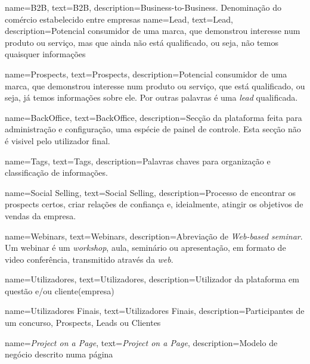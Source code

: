 {
        name=B2B,
        text=B2B,
        description={Business-to-Business. Denominação do comércio estabelecido entre empresas}
}
{
	name=Lead,
	text=Lead,
	description={Potencial consumidor de uma marca, que demonstrou interesse num produto ou serviço, mas que ainda não está qualificado, ou seja, não temos quaisquer informações}
}

{
	name=Prospects,
	text=Prospects,
	description={Potencial consumidor de uma marca, que demonstrou interesse num produto ou serviço, que está qualificado, ou seja, já temos informações sobre ele. Por outras palavras é uma \textit{lead} qualificada.}
}

{
	name=BackOffice,
	text=BackOffice,
	description={Secção da plataforma feita para administração e configuração, uma espécie de painel de controle. Esta secção não é visivel pelo utilizador final. }
}

{
	name=Tags,
	text=Tags,
	description={Palavras chaves para organização e classificação de informações. }
}

{
	name=Social Selling,
	text=Social Selling,
	description={Processo de encontrar os prospects certos, criar relações de confiança e, ideialmente, atingir os objetivos de vendas da empresa.}
}

{
	name=Webinars,
	text=Webinars,
	description={Abreviação de \textit{Web-based seminar}. Um webinar é um \textit{workshop}, aula, seminário ou apresentação, em formato de video conferência, transmitido através da \textit{web}.}
}

{
	name=Utilizadores,
	text=Utilizadores,
	description={Utilizador da plataforma em questão e/ou cliente(empresa)}
}

{
	name=Utilizadores Finais,
	text=Utilizadores Finais,
	description={Participantes de um concurso, Prospects, Leads ou  Clientes}
}

{
	name=\textit{Project on a Page},
	text=\textit{Project on a Page},
	description={Modelo de negócio descrito numa página}
}


